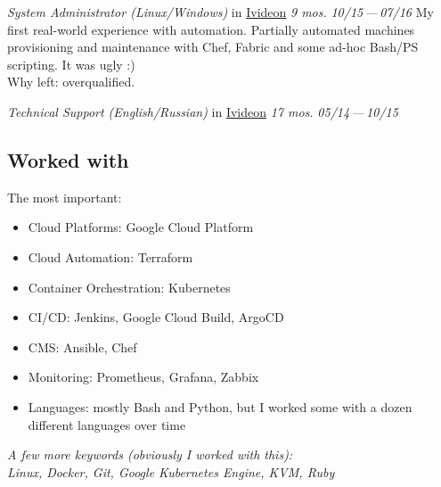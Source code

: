 \documentclass[11pt, a4paper]{article}
\newcommand{\Delimitline}{
  \vspace{-2ex}
  \noindent\makebox[\linewidth]{\rule{\DelimitlineLength}{0.12ex}} }
\newcommand{\forceindent}{\leavevmode{\parindent=1em\indent}}
\begin{document}
\begin{etaremune}[
  topsep=1ex,itemsep=1.5ex,partopsep=0ex,
  parsep=0ex,rightmargin=1em,leftmargin=2em
]
  \item
    \emph{System Administrator (Linux/Windows)}\hfill
    in \href{https://ivideon.com}{Ivideon}\hspace{1.0em}
    \textit{9 mos.}\hspace{1.0em}
    \textit{10/15\,—\,07/16}\vspace{1.5ex}\newline
    \forceindent My first real-world experience with automation. Partially automated machines provisioning and maintenance with Chef, Fabric and some ad-hoc Bash/PS scripting. It was ugly :)\\[0.7ex]
    \forceindent Why left: overqualified.

  \item
    \emph{Technical Support (English/Russian)}\hfill
    in \href{https://ivideon.com}{Ivideon}\hspace{1.0em}
    \textit{17 mos.}\hspace{1.0em}
    \textit{05/14\,—\,10/15}
\end{etaremune}

\vspace{0ex}


\subsection*{Worked with\vphantom{ (skills)}}
\Delimitline

The most important:
\begin{itemize}
  \item Cloud Platforms: Google Cloud Platform
  \item Cloud Automation: Terraform
  \item Container Orchestration: Kubernetes
  \item CI/CD: Jenkins, Google Cloud Build, ArgoCD
  \item CMS: Ansible, Chef
  \item Monitoring: Prometheus, Grafana, Zabbix
  \item Languages: mostly Bash and Python, but I worked some with a dozen different languages over time
\end{itemize}\vspace{2ex}

\begin{flushright}
  \textit{A few more keywords (obviously I worked with this):\\
  Linux, Docker, Git, Google Kubernetes Engine, KVM, Ruby}
\end{flushright}


\subsection*{\vphantom{Education: }}
\vphantom{ middle school}
\end{document}

